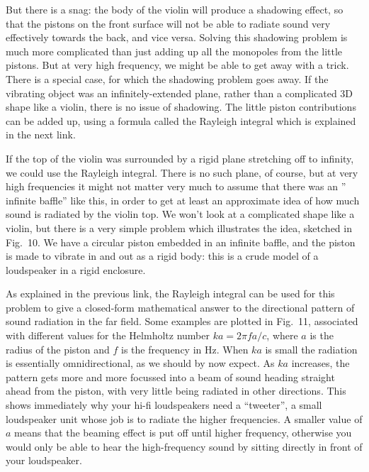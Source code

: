   But there is a snag: the body of the violin will produce a shadowing effect, 
  so that the pistons on the front surface will not be able to radiate sound 
  very effectively towards the back, and vice versa. Solving this shadowing 
  problem is much more complicated than just adding up all the monopoles from 
  the little pistons. But at very high frequency, we might be able to get away 
  with a trick. There is a special case, for which the shadowing problem goes 
  away. If the vibrating object was an infinitely-extended plane, rather than a 
  complicated 3D shape like a violin, there is no issue of shadowing. The 
  little piston contributions can be added up, using a formula called the 
  Rayleigh integral which is explained in the next link. 

  If the top of the violin was surrounded by a rigid plane stretching off to 
  infinity, we could use the Rayleigh integral. There is no such plane, of 
  course, but at very high frequencies it might not matter very much to assume 
  that there was an '' infinite baffle'' like this, in order to get at least an 
  approximate idea of how much sound is radiated by the violin top. We won't 
  look at a complicated shape like a violin, but there is a very simple problem 
  which illustrates the idea, sketched in Fig.\ 10. We have a circular piston 
  embedded in an infinite baffle, and the piston is made to vibrate in and out 
  as a rigid body: this is a crude model of a loudspeaker in a rigid enclosure. 

  As explained in the previous link, the Rayleigh integral can be used for this 
  problem to give a closed-form mathematical answer to the directional pattern 
  of sound radiation in the far field. Some examples are plotted in Fig.\ 11, 
  associated with different values for the Helmholtz number $ka=2 \pi f a/c$, 
  where $a$ is the radius of the piston and $f$ is the frequency in Hz. When 
  $ka$ is small the radiation is essentially omnidirectional, as we should by 
  now expect. As $ka$ increases, the pattern gets more and more focussed into a 
  beam of sound heading straight ahead from the piston, with very little being 
  radiated in other directions. This shows immediately why your hi-fi 
  loudspeakers need a ``tweeter'', a small loudspeaker unit whose job is to 
  radiate the higher frequencies. A smaller value of $a$ means that the beaming 
  effect is put off until higher frequency, otherwise you would only be able to 
  hear the high-frequency sound by sitting directly in front of your 
  loudspeaker. 

